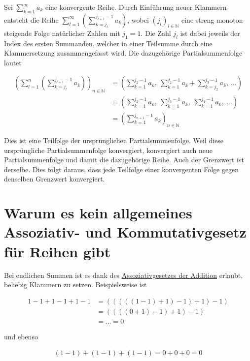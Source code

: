 \documentclass[fontsize=9pt,
               parskip=half-,
               DIV=14,
               listof=chapterentry,
               tocflat]{scrbook}
\begin{document}
\begin{proof*}
Sei $\sum _{k=1}^{\infty }a_{k}$ eine konvergente Reihe. Durch Einführung neuer Klammern entsteht die Reihe $\sum _{l=1}^{\infty }\left(\sum _{k=j_{l}}^{j_{l+1}-1}a_{k}\right)$, wobei $(j_{l})_{l\in \mathbb {N} }$ eine streng monoton steigende Folge natürlicher Zahlen mit $j_{1}=1$. Die Zahl $j_{l}$ ist dabei jeweils der Index des ersten Summanden, welcher in einer Teilsumme durch eine Klammersetzung zusammengefasst wird. Die dazugehörige Partialsummenfolge lautet

\begin{align*}
\left(\sum _{l=1}^{n}\left(\sum _{k=j_{l}}^{j_{l+1}-1}a_{k}\right)\right)_{n\in \mathbb {N} }&=\left(\sum _{k=1}^{j_{2}-1}a_{k},\ \sum _{k=1}^{j_{2}-1}a_{k}+\sum _{k=j_{2}}^{j_{3}-1}a_{k},\ \ldots \right)\\[0.5em]&=\left(\sum _{k=1}^{j_{2}-1}a_{k},\ \sum _{k=1}^{j_{3}-1}a_{k},\ \sum _{k=1}^{j_{4}-1}a_{k},\ \ldots \right)\\[0.5em]&=\left(\sum _{k=1}^{j_{n+1}-1}a_{k}\right)_{n\in \mathbb {N} }
\end{align*}

Dies ist eine Teilfolge der ursprünglichen Partialsummenfolge. Weil diese ursprüngliche Partialsummenfolge konvergiert, konvergiert auch neue Partialsummenfolge und damit die dazugehörige Reihe. Auch der Grenzwert ist derselbe. Dies folgt daraus, dass jede Teilfolge einer konvergenten Folge gegen denselben Grenzwert konvergiert.

\end{proof*}

\section{Warum es kein allgemeines Assoziativ- und Kommutativgesetz für Reihen gibt}

Bei endlichen Summen ist es dank des \href{https://de.wikibooks.org/wiki/Mathe\_für\_Nicht-Freaks:\_Körperaxiome}
{Assoziativgesetzes der Addition} erlaubt, beliebig Klammern zu setzen. Beispielsweise ist

\begin{align*}
1-1+1-1+1-1&=(((((1-1)+1)-1)+1)-1)\\[0.3em]&=((((0+1)-1)+1)-1)\\[0.3em]&=\ldots =0
\end{align*}

und ebenso

\begin{align*}
(1-1)+(1-1)+(1-1)=0+0+0=0
\end{align*}
\end{document}

